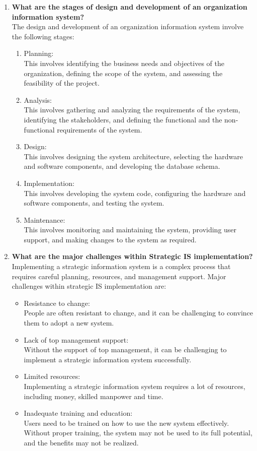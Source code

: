 \documentclass[12pt]{article}
\begin{document}
\begin{enumerate}
    \item {\bfseries What are the stages of design and development of an organization information system?\\}
    The design and development of an organization information system involve the following stages:
\begin{enumerate}
    \item Planning:\\ This involves identifying the business needs and objectives of the organization, defining the scope of the system, and assessing the feasibility of the project.
    \item Analysis: \\ This involves gathering and analyzing the requirements of the system, identifying the stakeholders, and defining the functional and the non-functional requirements of the system.
    \item Design:\\ This involves designing the system architecture, selecting the hardware and software components, and developing the database schema.
    \item Implementation: \\ This involves developing the system code, configuring the hardware and software components, and testing the system.
    \item Maintenance: \\ This involves monitoring and maintaining the system, providing user support, and making changes to the system as required.
\end{enumerate}

    \item {\bfseries What are the major challenges within Strategic IS implementation?\\}
    Implementing a strategic information system is a complex process that requires careful planning, resources, and management support. Major challenges within strategic IS implementation are:
    \begin{itemize}
        \item Resistance to change:\\ People are often resistant to change, and it can be challenging to convince them to adopt a new system.
        \item Lack of top management support:\\ Without the support of top management, it can be challenging to implement a strategic information system successfully.
        \item Limited resources:\\ Implementing a strategic information system requires a lot of resources, including money, skilled manpower and time.
        \item Inadequate training and education:\\ Users need to be trained on how to use the new system effectively. Without proper training, the system may not be used to its full potential, and the benefits may not be realized.
    \end{itemize}


\end{enumerate}
\end{document}
